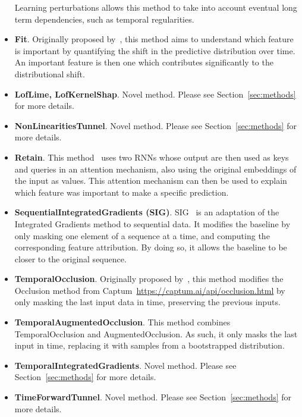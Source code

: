 \begin{itemize}
        Learning perturbations allows this method to take into account eventual long term dependencies, such as
        temporal regularities.
    \item \textbf{Fit}.
        Originally proposed by~\citep{tonekaboni2020went}, this method aims to understand which feature is important by
        quantifying the shift in the predictive distribution over time.
        An important feature is then one which contributes significantly to the distributional shift.
    \item \textbf{LofLime, LofKernelShap}.
        Novel method.
        Please see Section~\ref{sec:methods} for more details.
    \item \textbf{NonLinearitiesTunnel}.
        Novel method.
        Please see Section~\ref{sec:methods} for more details.
    \item \textbf{Retain}.
        This method~\citep{choi2016retain} uses two RNNs whose output are then used as keys and queries in an attention
        mechanism, also using the original embeddings of the input as values.
        This attention mechanism can then be used to explain which feature was important to make a specific prediction.
    \item \textbf{SequentialIntegratedGradients (SIG)}.
        SIG~\citep{enguehard2023sequential} is an adaptation of the Integrated Gradients method to sequential data.
        It modifies the baseline by only masking one element of a sequence at a time, and computing the corresponding
        feature attribution.
        By doing so, it allows the baseline to be closer to the original sequence.
    \item \textbf{TemporalOcclusion}.
        Originally proposed by~\citep{tonekaboni2020went}, this method modifies the Occlusion method from
        Captum~\url{https://captum.ai/api/occlusion.html} by only masking the last input data in time, preserving the
        previous inputs.
    \item \textbf{TemporalAugmentedOcclusion}.
        This method combines TemporalOcclusion and AugmentedOcclusion.
        As such, it only masks the last input in time, replacing it with samples from a bootstrapped distribution.
    \item \textbf{TemporalIntegratedGradients}.
        Novel method.
        Please see Section~\ref{sec:methods} for more details.
    \item \textbf{TimeForwardTunnel}.
        Novel method.
        Please see Section~\ref{sec:methods} for more details.

\end{itemize}


